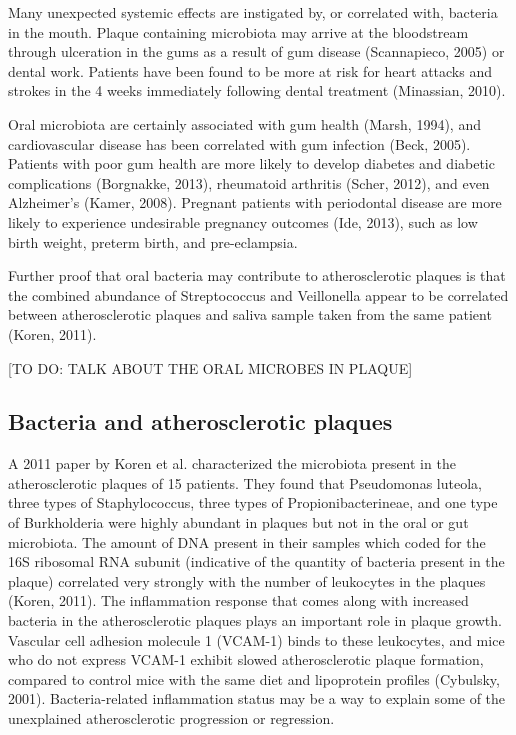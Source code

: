 Many unexpected systemic effects are instigated by, or correlated with, bacteria in the mouth. Plaque containing microbiota may arrive at the bloodstream through ulceration in the gums as a result of gum disease (Scannapieco, 2005) or dental work. Patients have been found to be more at risk for heart attacks and strokes in the 4 weeks immediately following dental treatment (Minassian, 2010).

Oral microbiota are certainly associated with gum health (Marsh, 1994), and cardiovascular disease has been correlated with gum infection (Beck, 2005). Patients with poor gum health are more likely to develop diabetes and diabetic complications (Borgnakke, 2013), rheumatoid arthritis (Scher, 2012), and even Alzheimer’s (Kamer, 2008). Pregnant patients with periodontal disease are more likely to experience undesirable pregnancy outcomes (Ide, 2013), such as low birth weight, preterm birth, and pre-eclampsia.

Further proof that oral bacteria may contribute to atherosclerotic plaques is that the combined abundance of Streptococcus and Veillonella appear to be correlated between atherosclerotic plaques and saliva sample taken from the same patient (Koren, 2011).

[TO DO: TALK ABOUT THE ORAL MICROBES IN PLAQUE]

\subsection{Bacteria and atherosclerotic plaques}
A 2011 paper by Koren et al. characterized the microbiota present in the atherosclerotic plaques of 15 patients. They found that Pseudomonas luteola, three types of Staphylococcus, three types of Propionibacterineae, and one type of Burkholderia were highly abundant in plaques but not in the oral or gut microbiota. The amount of DNA present in their samples which coded for the 16S ribosomal RNA subunit (indicative of the quantity of bacteria present in the plaque) correlated very strongly with the number of leukocytes in the plaques (Koren, 2011). The inflammation response that comes along with increased bacteria in the atherosclerotic plaques plays an important role in plaque growth. Vascular cell adhesion molecule 1 (VCAM-1) binds to these leukocytes, and mice who do not express VCAM-1 exhibit slowed atherosclerotic plaque formation, compared to control mice with the same diet and lipoprotein profiles (Cybulsky, 2001). Bacteria-related inflammation status may be a way to explain some of the unexplained atherosclerotic progression or regression.

